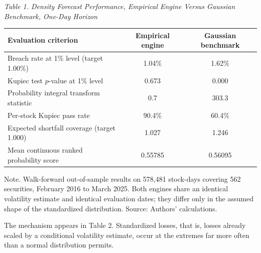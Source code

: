\documentclass[12pt]{article}
\begin{document}
\begin{table}[htbp]
\centering
\emph{Table 1. Density Forecast Performance, Empirical Engine Versus Gaussian
Benchmark, One-Day Horizon}
\vspace{0.3\baselineskip}
\begin{singlespace}
\begin{tabular}{lcc}
\toprule
Evaluation criterion & Empirical engine & Gaussian benchmark \\
\midrule
Breach rate at 1\% level (target 1.00\%) & 1.04\% & 1.62\% \\
Kupiec test $p$-value at 1\% level & 0.673 & 0.000 \\
Probability integral transform statistic & 0.7 & 303.3 \\
Per-stock Kupiec pass rate & 90.4\% & 60.4\% \\
Expected shortfall coverage (target 1.000) & 1.027 & 1.246 \\
Mean continuous ranked probability score & 0.55785 & 0.56095 \\
\bottomrule
\end{tabular}
\end{singlespace}
\vspace{0.3\baselineskip}
\begin{singlespace}
\RaggedRight
Note. Walk-forward out-of-sample results on 578,481 stock-days
covering 562 securities, February 2016 to March 2025. Both engines share an
identical volatility estimate and identical evaluation dates; they differ only
in the assumed shape of the standardized distribution. Source: Authors'
calculations.
\end{singlespace}
\end{table}

The mechanism appears in Table 2. Standardized losses, that is, losses already
scaled by a conditional volatility estimate, occur at the extremes far more
often than a normal distribution permits.
\end{document}
